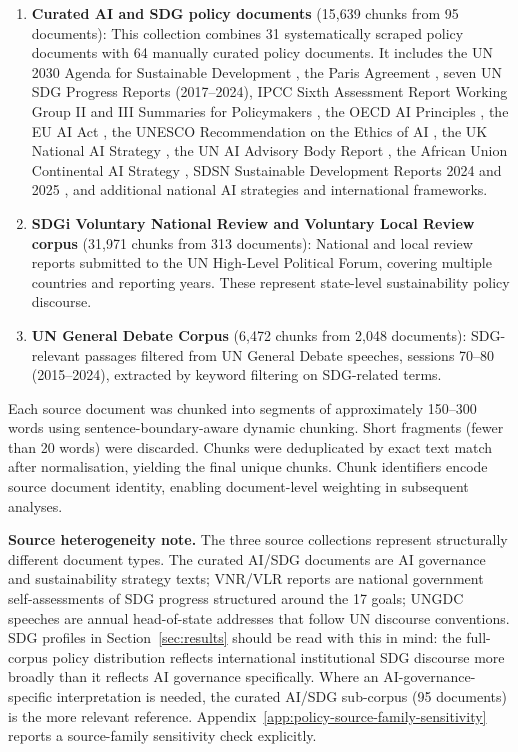 \documentclass[12pt,a4paper]{article}
\begin{document}
\begin{enumerate}
  \item \textbf{Curated AI and SDG policy documents} (15,639 chunks from 95 documents): This collection combines 31 systematically scraped policy documents with 64 manually curated policy documents. It includes the UN 2030 Agenda for Sustainable Development \parencite{UN2015}, the Paris Agreement \parencite{Paris2015}, seven UN SDG Progress Reports (2017--2024), IPCC Sixth Assessment Report Working Group II and III Summaries for Policymakers \parencite{IPCC2022}, the OECD AI Principles \parencite{OECD2019}, the EU AI Act \parencite{EUAI2024}, the UNESCO Recommendation on the Ethics of AI \parencite{UNESCO2021}, the UK National AI Strategy \parencite{UKAI2021}, the UN AI Advisory Body Report \parencite{UNAI2024}, the African Union Continental AI Strategy \parencite{AUAI2024}, SDSN Sustainable Development Reports 2024 and 2025 \parencite{Sachs2024,Sachs2025}, and additional national AI strategies and international frameworks.

  \item \textbf{SDGi Voluntary National Review and Voluntary Local Review corpus} \parencite{SDGi2024} (31,971 chunks from 313 documents): National and local review reports submitted to the UN High-Level Political Forum, covering multiple countries and reporting years. These represent state-level sustainability policy discourse.

  \item \textbf{UN General Debate Corpus} \parencite{UNGDC2024} (6,472 chunks from 2,048 documents): SDG-relevant passages filtered from UN General Debate speeches, sessions 70--80 (2015--2024), extracted by keyword filtering on SDG-related terms.
\end{enumerate}

Each source document was chunked into segments of approximately 150--300 words using sentence-boundary-aware dynamic chunking. Short fragments (fewer than 20 words) were discarded. Chunks were deduplicated by exact text match after normalisation, yielding the final \NPolicyChunks{} unique chunks. Chunk identifiers encode source document identity, enabling document-level weighting in subsequent analyses.

\textbf{Source heterogeneity note.} The three source collections represent structurally different document types. The curated AI/SDG documents are AI governance and sustainability strategy texts; VNR/VLR reports are national government self-assessments of SDG progress structured around the 17 goals; UNGDC speeches are annual head-of-state addresses that follow UN discourse conventions. SDG profiles in Section~\ref{sec:results} should be read with this in mind: the full-corpus policy distribution reflects international institutional SDG discourse more broadly than it reflects AI governance specifically. Where an AI-governance-specific interpretation is needed, the curated AI/SDG sub-corpus (95 documents) is the more relevant reference. Appendix~\ref{app:policy-source-family-sensitivity} reports a source-family sensitivity check explicitly.
\end{document}
